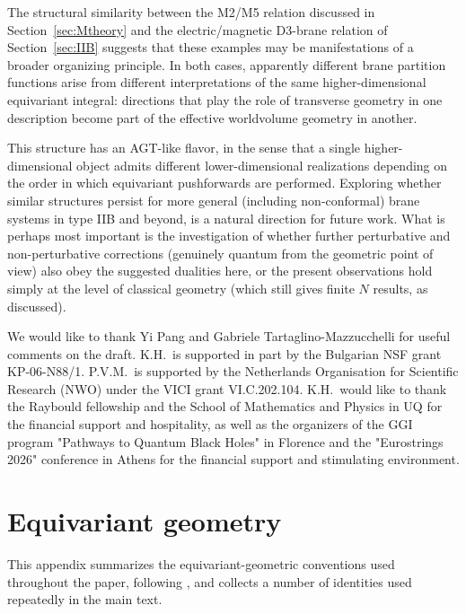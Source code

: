 \documentclass[11pt,a4paper]{article}
\theoremstyle{definition}
\theoremstyle{identity}
\theoremstyle{remark}
\begin{document}
\medskip

The structural similarity between the M2/M5 relation discussed in Section~\ref{sec:Mtheory}
and the electric/magnetic D3-brane relation of Section~\ref{sec:IIB} suggests that these
examples may be manifestations of a broader organizing principle. In both cases, apparently
different brane partition functions arise from different interpretations of the same
higher-dimensional equivariant integral: directions that play the role of transverse geometry in
one description become part of the effective worldvolume geometry in another.

This structure has an AGT-like flavor, in the sense that a single higher-dimensional object
admits different lower-dimensional realizations depending on the order in which equivariant
pushforwards are performed. Exploring whether similar structures persist for more general (including
non-conformal) brane systems in type IIB and beyond, is a natural direction for future work. What is perhaps most important is the investigation of whether further perturbative and non-perturbative corrections (genuinely quantum from the geometric point of view) also obey the suggested dualities here, or the present observations hold simply at the level of classical geometry (which still gives finite $N$ results, as discussed).

\acknowledgments
We would like to thank Yi Pang and Gabriele Tartaglino-Mazzucchelli for useful comments on the draft. K.H.\ is supported in part by the Bulgarian NSF grant KP-06-N88/1. P.V.M.\ is supported by the Netherlands Organisation for Scientific Research (NWO) under the VICI grant VI.C.202.104. K.H.\ would like to thank the Raybould fellowship and the School of Mathematics and Physics in UQ for the financial support and hospitality, as well as the organizers of the GGI program "Pathways to Quantum Black Holes" in Florence and the "Eurostrings 2026" conference in Athens for the financial support and stimulating environment.


\appendix

\section{Equivariant geometry}
\label{app:equivariant}

This appendix summarizes the equivariant-geometric conventions used throughout the paper,
following
\cite{Cassia:2025aus,Martelli:2023oqk,Hristov:2026tde},
and collects a number of identities used repeatedly in the main text.
\end{document}
